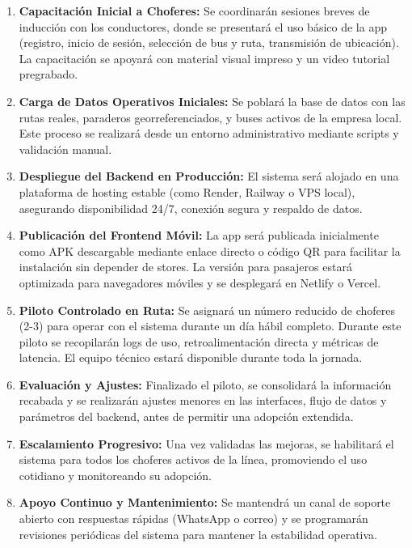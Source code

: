 \documentclass[12pt]{article}
\begin{document}
\begin{enumerate}
    \item \textbf{Capacitación Inicial a Choferes:} Se coordinarán sesiones breves de inducción con los conductores, donde se presentará el uso básico de la app (registro, inicio de sesión, selección de bus y ruta, transmisión de ubicación). La capacitación se apoyará con material visual impreso y un video tutorial pregrabado.

    \item \textbf{Carga de Datos Operativos Iniciales:} Se poblará la base de datos con las rutas reales, paraderos georreferenciados, y buses activos de la empresa local. Este proceso se realizará desde un entorno administrativo mediante scripts y validación manual.

    \item \textbf{Despliegue del Backend en Producción:} El sistema será alojado en una plataforma de hosting estable (como Render, Railway o VPS local), asegurando disponibilidad 24/7, conexión segura y respaldo de datos.

    \item \textbf{Publicación del Frontend Móvil:} La app será publicada inicialmente como APK descargable mediante enlace directo o código QR para facilitar la instalación sin depender de stores. La versión para pasajeros estará optimizada para navegadores móviles y se desplegará en Netlify o Vercel.

    \item \textbf{Piloto Controlado en Ruta:} Se asignará un número reducido de choferes (2-3) para operar con el sistema durante un día hábil completo. Durante este piloto se recopilarán logs de uso, retroalimentación directa y métricas de latencia. El equipo técnico estará disponible durante toda la jornada.

    \clearpage
    \item \textbf{Evaluación y Ajustes:} Finalizado el piloto, se consolidará la información recabada y se realizarán ajustes menores en las interfaces, flujo de datos y parámetros del backend, antes de permitir una adopción extendida.

    \item \textbf{Escalamiento Progresivo:} Una vez validadas las mejoras, se habilitará el sistema para todos los choferes activos de la línea, promoviendo el uso cotidiano y monitoreando su adopción.

    \item \textbf{Apoyo Continuo y Mantenimiento:} Se mantendrá un canal de soporte abierto con respuestas rápidas (WhatsApp o correo) y se programarán revisiones periódicas del sistema para mantener la estabilidad operativa.
\end{enumerate}
\end{document}
